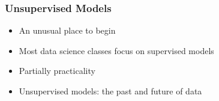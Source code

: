 \documentclass{beamer}
\begin{document}
	

  

\begin{frame}
	\frametitle{Unsupervised Models}
	\begin{itemize}
		\item An unusual place to begin \pause 
		\item Most data science classes focus on supervised models \pause 
		\item Partially practicality \pause 
		\item Unsupervised models: the past and future of data
	\end{itemize} 
\end{frame}




\end{document}
